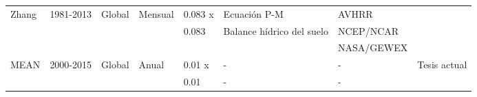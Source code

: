 \begin{sidewaystable}
\begin{tabular}{llllllll}
Zhang        & 1981-2013 & Global    & Mensual    & 0.083 x    & Ecuación P-M              & AVHRR      & \citet{zhang2015vegetation}      \\
             &           &           &            & 0.083      & Balance hídrico del suelo & NCEP/NCAR  &                 \\
             &           &           &            &            &                           & NASA/GEWEX &                 \\
MEAN         & 2000-2015 & Global    & Anual      & 0.01 x     & -                         & -          & Tesis actual    \\
             &           &           &            & 0.01       & -                         & -          &                  \\ \hline 
\end{tabular}
\end{sidewaystable}